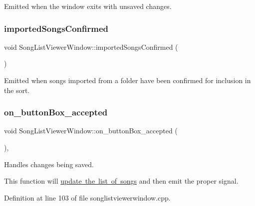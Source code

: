Emitted when the window exits with unsaved changes. 

\mbox{\label{class_song_list_viewer_window_a72159650ecd17b063a01c97b38c9c3c4}} 
\subsubsection{\texorpdfstring{imported\+Songs\+Confirmed}{importedSongsConfirmed}}
{\footnotesize\ttfamily void Song\+List\+Viewer\+Window\+::imported\+Songs\+Confirmed (\begin{DoxyParamCaption}{ }\end{DoxyParamCaption})\hspace{0.3cm}{\ttfamily [signal]}}



Emitted when songs imported from a folder have been confirmed for inclusion in the sort. 

\mbox{\label{class_song_list_viewer_window_a8f8a21788c5f078302abe140bf80ac4c}} 
\subsubsection{\texorpdfstring{on\+\_\+button\+Box\+\_\+accepted}{on\_buttonBox\_accepted}}
{\footnotesize\ttfamily void Song\+List\+Viewer\+Window\+::on\+\_\+button\+Box\+\_\+accepted (\begin{DoxyParamCaption}{ }\end{DoxyParamCaption})\hspace{0.3cm}{\ttfamily [private]}, {\ttfamily [slot]}}



Handles changes being saved. 

This function will \mbox{\hyperlink{class_song_list_viewer_window_ad53bcfcb56d146d8ab1d9f91696b143f}{update the list of songs}} and then emit the proper signal. 

Definition at line 103 of file songlistviewerwindow.\+cpp.


